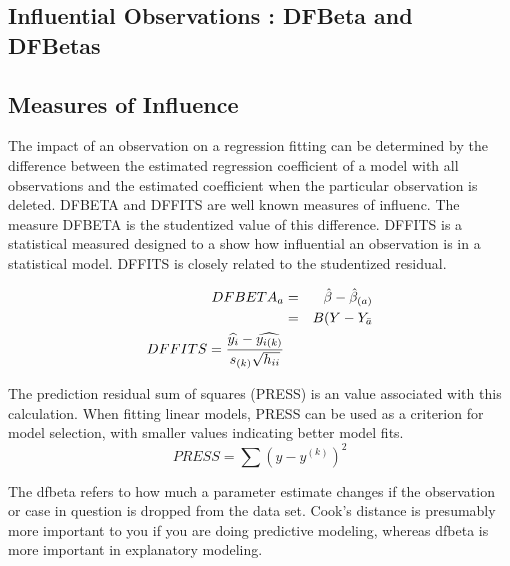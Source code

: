 \documentclass[Main.tex]{subfiles}
\begin{document}
	\subsection{Influential Observations : DFBeta and DFBetas}
	\subsection{Measures of Influence} 
	The impact of an observation on a regression fitting can be determined by the difference between the estimated regression coefficient of a model with all observations and the estimated coefficient when the particular observation is deleted. DFBETA and DFFITS are well known measures of influenc. The measure DFBETA is the studentized value of this difference.	DFFITS is a statistical measured designed to a show how influential an observation is in a statistical model. DFFITS is closely related to the studentized residual.
	
	\begin{eqnarray}
	DFBETA_{a} &=& \hat{\beta} - \hat{\beta}_{(a)} \\
	&=& B(Y-Y_{\bar{a}}
	\\ DFFITS = {\widehat{y_i} -
		\widehat{y_{i(k)}} \over s_{(k)} \sqrt{h_{ii}}} 
	\end{eqnarray}
	
	The prediction residual sum of squares (PRESS) is an value associated with this calculation. When fitting linear models, PRESS can be used as a criterion for model selection, with smaller values indicating better model fits.
	\begin{displaymath}
	PRESS = \sum(y-y^{(k)})^2
	\end{displaymath}
	
	\newpage
	The dfbeta refers to how much a parameter estimate changes if the observation or case in question is dropped from the data set.  Cook's distance is presumably more important to you if you are doing predictive modeling, whereas dfbeta is more important in explanatory modeling.
\end{document}
